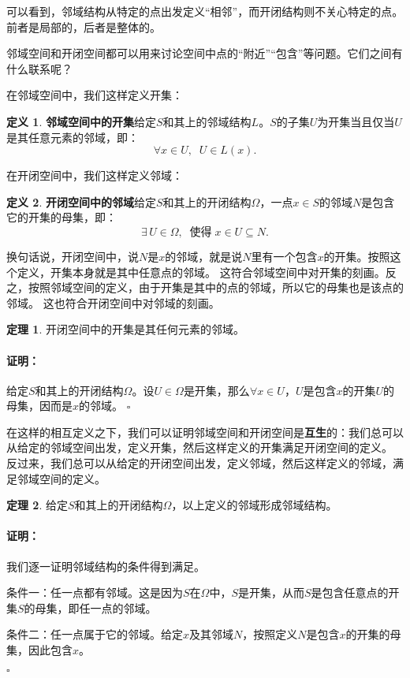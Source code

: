 \documentclass[12pt,UTF8]{ctexbook}
\theoremstyle{definition}
\newtheorem{df}{定义}[section]
\newtheorem{tm}{定理}[section]
\theoremstyle{plain}
\renewenvironment{proof}{\paragraph{\textbf{证明：}}}{\hfill$\square$}
\begin{document}
\begin{appendix}
可以看到，邻域结构从特定的点出发定义“相邻”，而开闭结构则不关心特定的点。前者是局部的，后者是整体的。

邻域空间和开闭空间都可以用来讨论空间中点的“附近”“包含”等问题。它们之间有什么联系呢？

在邻域空间中，我们这样定义开集：
\begin{df}{\textbf{邻域空间中的开集}}\label{df:a-0-2}
    给定$S$和其上的邻域结构$L$。$S$的子集$U$为开集当且仅当$U$是其任意元素的邻域，即：
    $$ \forall x\in U, \;\; U\in L(x).$$
\end{df}

在开闭空间中，我们这样定义邻域：
\begin{df}{\textbf{开闭空间中的邻域}}\label{df:a-0-3}
    给定$S$和其上的开闭结构$\Omega$，一点$x\in S$的邻域$N$是包含它的开集的母集，即：
    $$ \exists\, U \in \Omega, \;\; \mbox{使得}\; x\in U \subseteq N.  $$
\end{df}
换句话说，开闭空间中，说$N$是$x$的邻域，就是说$N$里有一个包含$x$的开集。按照这个定义，开集本身就是其中任意点的邻域。
这符合邻域空间中对开集的刻画。反之，按照邻域空间的定义，由于开集是其中的点的邻域，所以它的母集也是该点的邻域。
这也符合开闭空间中对邻域的刻画。

\begin{tm}\label{tm:a-0-0}
    开闭空间中的开集是其任何元素的邻域。
\end{tm}

\begin{proof}
    给定$S$和其上的开闭结构$\Omega$。设$U\in \Omega$是开集，那么$\forall x\in U$，$U$是包含$x$的开集$U$的母集，因而是$x$的邻域。
\end{proof}

在这样的相互定义之下，我们可以证明邻域空间和开闭空间是\textbf{互生}的：我们总可以从给定的邻域空间出发，定义开集，然后这样定义的开集满足开闭空间的定义。
反过来，我们总可以从给定的开闭空间出发，定义邻域，然后这样定义的邻域，满足邻域空间的定义。

\begin{tm}
    给定$S$和其上的开闭结构$\Omega$，以上定义的邻域形成邻域结构。
\end{tm}

\begin{proof}
    我们逐一证明邻域结构的条件得到满足。

    条件一：任一点都有邻域。这是因为$S$在$\Omega$中，$S$是开集，从而$S$是包含任意点的开集$S$的母集，即任一点的邻域。

    条件二：任一点属于它的邻域。给定$x$及其邻域$N$，按照定义$N$是包含$x$的开集的母集，因此包含$x$。


\end{proof}
\end{appendix}
\end{document}
